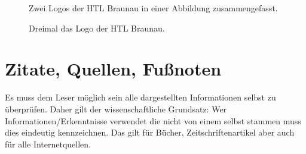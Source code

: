 \begin{figure}[H]
  \centering
  \qquad
  \label{fig:canvas_01}
  \caption[Zwei Logos der HTL Braunau]{Zwei Logos der HTL Braunau in einer Abbildung zusammengefasst.}
\end{figure}


\begin{figure}[H]
  \centering
  \qquad
\qquad
  \label{fig:canvas_04}
\caption[Drei Logos der HTL Braunau]{Dreimal das Logo der HTL Braunau.}
\end{figure}


\section{Zitate, Quellen, Fußnoten}

Es muss dem Leser möglich sein alle dargestellten Informationen selbst zu überprüfen.
Daher gilt der wissenschaftliche Grundsatz: 
Wer Informationen/Erkenntnisse verwendet die nicht von einem selbst stammen muss dies eindeutig kennzeichnen.
Das gilt für Bücher, Zeitschriftenartikel aber auch für alle Internetquellen.

